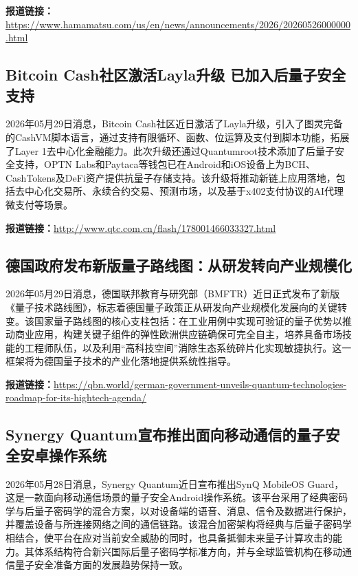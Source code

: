 \documentclass[12pt,a4paper]{ctexart}
\begin{document}
\noindent\textbf{报道链接：}\url{https://www.hamamatsu.com/us/en/news/announcements/2026/20260526000000.html}

\subsection{ Bitcoin Cash社区激活Layla升级 已加入后量子安全支持 }

2026年05月29日消息，Bitcoin Cash社区近日激活了Layla升级，引入了图灵完备的CashVM脚本语言，通过支持有限循环、函数、位运算及支付到脚本功能，拓展了Layer 1去中心化金融能力。此次升级还通过Quantumroot技术添加了后量子安全支持，OPTN Labs和Paytaca等钱包已在Android和iOS设备上为BCH、CashTokens及DeFi资产提供抗量子存储支持。该升级将推动新链上应用落地，包括去中心化交易所、永续合约交易、预测市场，以及基于x402支付协议的AI代理微支付等场景。

\noindent\textbf{报道链接：}\url{http://www.qtc.com.cn/flash/178001466033327.html}

\subsection{ 德国政府发布新版量子路线图：从研发转向产业规模化 }

2026年05月29日消息，德国联邦教育与研究部（BMFTR）近日正式发布了新版《量子技术路线图》，标志着德国量子政策正从研发向产业规模化发展向的关键转变。该国家量子路线图的核心支柱包括：在工业用例中实现可验证的量子优势以推动商业应用，构建关键子组件的弹性欧洲供应链确保可完全自主，培养具备市场技能的工程师队伍，以及利用“高科技空间”消除生态系统碎片化实现敏捷执行。这一框架将为德国量子技术的产业化落地提供系统性指导。

\noindent\textbf{报道链接：}\url{https://qbn.world/german-government-unveils-quantum-technologies-roadmap-for-its-hightech-agenda/}

\subsection{ Synergy Quantum宣布推出面向移动通信的量子安全安卓操作系统 }

2026年05月28日消息，Synergy Quantum近日宣布推出SynQ MobileOS Guard，这是一款面向移动通信场景的量子安全Android操作系统。该平台采用了经典密码学与后量子密码学的混合方案，以对设备端的语音、消息、信令及数据进行保护，并覆盖设备与所连接网络之间的通信链路。该混合加密架构将经典与后量子密码学相结合，使平台在应对当前安全威胁的同时，也具备抵御未来量子计算攻击的能力。其体系结构符合新兴国际后量子密码学标准方向，并与全球监管机构在移动通信量子安全准备方面的发展趋势保持一致。
\end{document}
